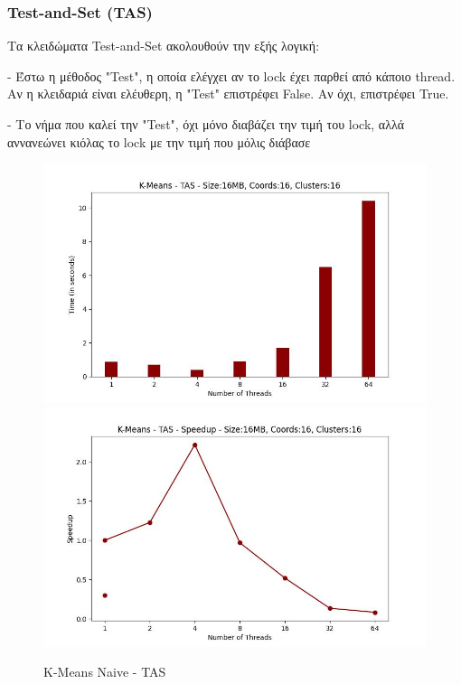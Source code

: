 \documentclass[letterpaper,12pt]{article}
\begin{document}
\subsubsection{Test-and-Set (TAS)}

Τα κλειδώματα Test-and-Set ακολουθούν την εξής λογική:

- Έστω η μέθοδος "Test", η οποία ελέγχει αν το lock έχει παρθεί από κάποιο thread. Αν η κλειδαριά
είναι ελέυθερη, η "Test" επιστρέφει False. Αν όχι, επιστρέφει True.

- Το νήμα που καλεί την "Test", όχι μόνο διαβάζει την τιμή του lock, αλλά αννανεώνει κιόλας το lock 
με την τιμή που μόλις διάβασε

\begin{figure}[H]
    \centering
        \includegraphics[scale=0.4]{outFilesAffinityMouliko/plots/kmeans_locks_tas.jpg}
        \includegraphics[scale=0.4]{outFilesAffinityMouliko/plots/kmeans_locks_tas_speedup.jpg}
    \caption{K-Means Naive - TAS}
    \label{fig:K-Means Naive - TAS}
\end{figure}
\end{document}
